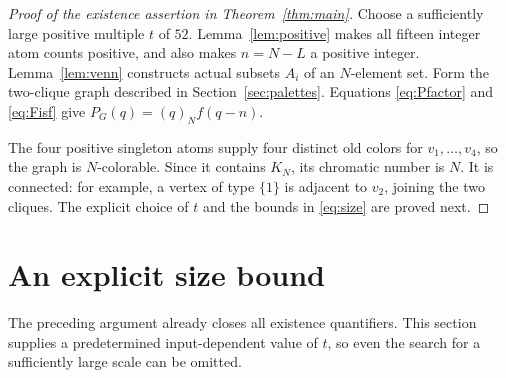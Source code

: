 \documentclass[11pt,a4paper]{article}
\theoremstyle{definition}
\newcommand{\fall}[2]{(#1)_{#2}}
\begin{document}
\begin{proof}[Proof of the existence assertion in Theorem~\ref{thm:main}]
Choose a sufficiently large positive multiple $t$ of $52$.
Lemma~\ref{lem:positive} makes all fifteen integer atom counts positive,
and also makes $n=N-L$ a positive integer. Lemma~\ref{lem:venn}
constructs actual subsets $A_i$ of an $N$-element set. Form the two-clique
graph described in Section~\ref{sec:palettes}. Equations
\eqref{eq:Pfactor} and \eqref{eq:Fisf} give
$P_G(q)=\fall qNf(q-n)$.

The four positive singleton atoms supply four distinct old colors for
$v_1,\ldots,v_4$, so the graph is $N$-colorable. Since it contains
$K_N$, its chromatic number is $N$. It is connected: for example, a
vertex of type $\{1\}$ is adjacent to $v_2$, joining the two cliques.
The explicit choice of $t$ and the bounds in \eqref{eq:size} are proved
next.
\end{proof}

\section{An explicit size bound}\label{sec:effective}

The preceding argument already closes all existence quantifiers. This
section supplies a predetermined input-dependent value of $t$, so even
the search for a sufficiently large scale can be omitted.
\end{document}
